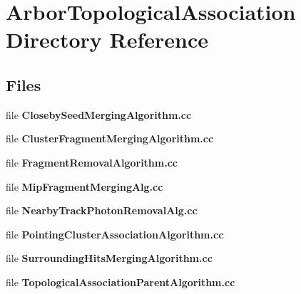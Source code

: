 \section{Arbor\+Topological\+Association Directory Reference}
\label{dir_f9ea8bb2cda65f1882ebe392318fcf58}
\subsection*{Files}
\begin{DoxyCompactItemize}
\item 
file {\bf Closeby\+Seed\+Merging\+Algorithm.\+cc}
\item 
file {\bf Cluster\+Fragment\+Merging\+Algorithm.\+cc}
\item 
file {\bf Fragment\+Removal\+Algorithm.\+cc}
\item 
file {\bf Mip\+Fragment\+Merging\+Alg.\+cc}
\item 
file {\bf Nearby\+Track\+Photon\+Removal\+Alg.\+cc}
\item 
file {\bf Pointing\+Cluster\+Association\+Algorithm.\+cc}
\item 
file {\bf Surrounding\+Hits\+Merging\+Algorithm.\+cc}
\item 
file {\bf Topological\+Association\+Parent\+Algorithm.\+cc}
\end{DoxyCompactItemize}
